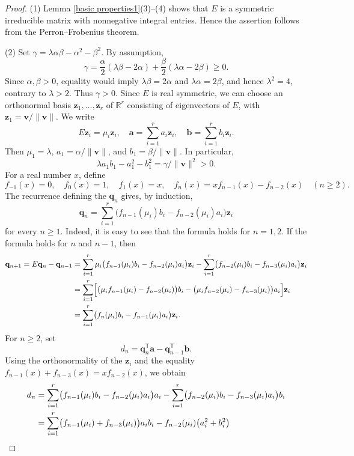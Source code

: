 \documentclass{amsart}
\theoremstyle{definition}
\theoremstyle{remark}
\numberwithin{equation}{thm}
\def\ge{\geqslant}
\def\T{\mathsf{T}}
\def\bfa{\mathbf{a}}
\def\bfb{\mathbf{b}}
\def\bfq{\mathbf{q}}
\def\bfv{\mathbf{v}}
\def\bfz{\mathbf{z}}
\begin{document}
\begin{proof}
(1) Lemma \ref{basic properties1}(3)--(4) shows that $E$ is a symmetric irreducible matrix with nonnegative integral entries. Hence the assertion follows from the Perron--Frobenius theorem.

(2) Set $\gamma=\lambda\alpha\beta-\alpha^2-\beta^2$. By assumption,
$$
\gamma=\frac{\alpha}{2}(\lambda\beta-2\alpha)+\frac{\beta}{2}(\lambda\alpha-2\beta)\ge0.
$$
Since $\alpha,\beta>0$, equality would imply $\lambda\beta=2\alpha$ and $\lambda\alpha=2\beta$, and hence $\lambda^2=4$, contrary to $\lambda>2$. Thus $\gamma>0$.
Since $E$ is real symmetric, we can choose an orthonormal basis $\bfz_1,\ldots,\bfz_r$ of $\mathbb{R}^r$ consisting of eigenvectors of $E$, with $\bfz_1=\bfv/\|\bfv\|$.
We write
$$
E\bfz_i=\mu_i\bfz_i, \quad \bfa=\sum_{i=1}^r a_i\bfz_i, \quad \bfb=\sum_{i=1}^r b_i\bfz_i.
$$
Then $\mu_1=\lambda$, $a_1=\alpha/\|\bfv\|$, and $b_1=\beta/\|\bfv\|$.
In particular,
\begin{equation}\label{rho coefficient}
\lambda a_1b_1-a_1^2-b_1^2=\gamma/\|\bfv\|^2>0.
\end{equation}
For a real number $x$, define
$$
f_{-1}(x)=0,\quad f_0(x)=1,\quad f_1(x)=x,\quad f_n(x)=xf_{n-1}(x)-f_{n-2}(x)\quad(n\ge2).
$$
The recurrence defining the $\bfq_n$ gives, by induction,
$$
\bfq_n=\sum_{i=1}^r\bigl(f_{n-1}(\mu_i)b_i-f_{n-2}(\mu_i)a_i\bigr)\bfz_i
$$
for every $n\ge1$.
Indeed, it is easy to see that the formula holds for $n=1,2$.
If the formula holds for $n$ and $n-1$, then
\begin{align*}
\bfq_{n+1}=E\bfq_n-\bfq_{n-1}&=\sum_{i=1}^r\mu_i\bigl(f_{n-1}(\mu_i)b_i-f_{n-2}(\mu_i)a_i\bigr)\bfz_i-\sum_{i=1}^r\bigl(f_{n-2}(\mu_i)b_i-f_{n-3}(\mu_i)a_i
\bigr)\bfz_i\\
&=\sum_{i=1}^r\Bigl[\bigl(\mu_i f_{n-1}(\mu_i)-f_{n-2}(\mu_i)\bigr)b_i-\bigl(\mu_i f_{n-2}(\mu_i)-f_{n-3}(\mu_i)\bigr)a_i\Bigr]\bfz_i\\
&=\sum_{i=1}^r\bigl(f_n(\mu_i)b_i-f_{n-1}(\mu_i)a_i\bigr)\bfz_i.
\end{align*}
For $n\ge2$, set
$$
d_n=\bfq_n^{\T}\bfa-\bfq_{n-1}^{\T}\bfb.
$$
Using the orthonormality of the $\bfz_i$ and the equality $f_{n-1}(x)+f_{n-3}(x)=x f_{n-2}(x)$, we obtain
\begin{align}\label{equality dn}
d_n&=\sum_{i=1}^r\bigl(f_{n-1}(\mu_i)b_i-f_{n-2}(\mu_i)a_i\bigr)a_i-\sum_{i=1}^r\bigl(f_{n-2}(\mu_i)b_i-f_{n-3}(\mu_i)a_i\bigr)b_i\\
&=\sum_{i=1}^r \bigl(f_{n-1}(\mu_i)+f_{n-3}(\mu_i)\bigr)a_ib_i-f_{n-2}(\mu_i)\bigl(a_i^2+b_i^2\bigr) \notag

\end{align}
\end{proof}
\end{document}
